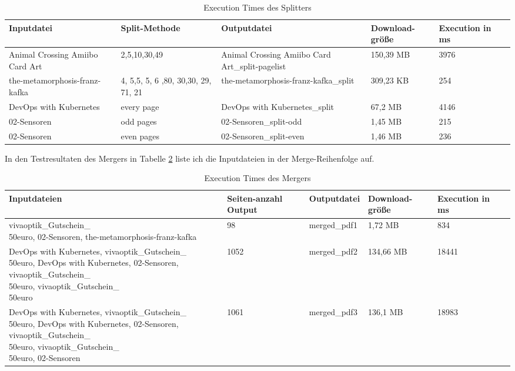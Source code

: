 \begin{table}[!htbp]
	\centering
	\begin{tabular}{|p{2.5cm}|p{3cm}|p{3cm}|p{2cm}|p{2cm}|p{2cm}|}
		\hline
		\textbf{Inputdatei}					& \textbf{Split-Methode}					& \textbf{Outputdatei}								& \textbf{Download-größe}	& \textbf{Execution in ms} 	\\ 
		\hline
		Animal Crossing Amiibo Card Art		& 2,5,10,30,49 								& Animal Crossing Amiibo Card Art\_split-pagelist 	& 150,39 MB					& 3976  						\\
		the-metamorphosis-franz-kafka		& 4, 5,5, 5, 6 ,80, 30,30, 29, 71, 21 		& the-metamorphosis-franz-kafka\_split 				& 309,23 KB				
											& 254  			\\
		DevOps with Kubernetes				& every page								& DevOps with Kubernetes\_split 					& 67,2 MB					& 4146  						\\
		02-Sensoren							& odd pages 								& 02-Sensoren\_split-odd 							& 1,45 MB					& 215  							\\
		02-Sensoren							& even pages								& 02-Sensoren\_split-even 							& 1,46 MB					& 236 							\\
		\hline
	\end{tabular}
	\caption{Execution Times des Splitters}
	\label{table:splitter-dur}
\end{table}

In den Testresultaten des Mergers in Tabelle \ref{table:merger-dur} liste ich die Inputdateien in der Merge-Reihenfolge auf.

\begin{table}[!htbp]
	\centering
	\begin{tabular}{|p{4cm}|p{1.7cm}|p{2.3cm}|p{2cm}|p{2cm}|p{2cm}|}
		\hline
		\textbf{Inputdateien}	& \textbf{Seiten-anzahl Output}		& \textbf{Outputdatei}		& \textbf{Download-größe}	& \textbf{Execution in ms} 	\\ 
		\hline
		\parbox[t]{4cm}{vivaoptik\_Gutschein\_\\50euro,} 02-Sensoren, the-metamorphosis-franz-kafka	& 98 & merged\_pdf1 & 1,72 MB		& 834  					\\
		
		DevOps with Kubernetes, \parbox[t]{4cm}{vivaoptik\_Gutschein\_\\50euro,} DevOps with Kubernetes, 02-Sensoren, \parbox[t]{4cm}{vivaoptik\_Gutschein\_\\50euro,} \parbox[t]{4cm}{vivaoptik\_Gutschein\_\\50euro}		& 1052 		& merged\_pdf2		& 134,66 MB		& 18441   						\\
		
		DevOps with Kubernetes, \parbox[t]{4cm}{vivaoptik\_Gutschein\_\\50euro,} DevOps with Kubernetes, 02-Sensoren, \parbox[t]{4cm}{vivaoptik\_Gutschein\_\\50euro,} \parbox[t]{4cm}{vivaoptik\_Gutschein\_\\50euro,} 02-Sensoren		& 1061 		& merged\_pdf3				& 136,1 MB					& 18983   						\\
		\hline
	\end{tabular}
	\caption{Execution Times des Mergers}
	\label{table:merger-dur}
\end{table}

